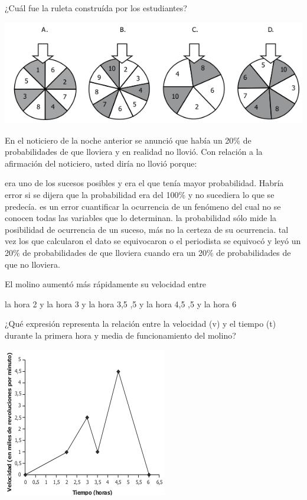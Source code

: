\documentclass[10pt,letterpaper,addpoints]{exam}
\begin{document}
\begin{questions}
¿Cuál fue la ruleta construída por los estudiantes?
\begin{center}
\includegraphics[scale=.65]{Images/ruletas.png}
\end{center}
\question En el noticiero de la noche anterior se anunció que había un 20\% de probabilidades de que lloviera y en realidad no llovió. Con relación a la afirmación del noticiero, usted diría no llovió porque:
\begin{choices}
\choice era uno de los sucesos posibles y era el que tenía mayor probabilidad. Habría error si se dijera que la probabilidad era del 100\% y no sucediera lo que se predecía.
\choice es un error cuantificar la ocurrencia de un fenómeno del cual no se conocen todas las variables que lo determinan.
\CorrectChoice la probabilidad sólo mide la posibilidad de ocurrencia de un suceso, más no la certeza de su ocurrencia.
\choice tal vez los que calcularon el dato se equivocaron o el periodista se equivocó y leyó un 20\% de probabilidades de que lloviera cuando era un 20\% de probabilidades de que no lloviera.
\end{choices}
\begin{minipage}{.45\textwidth}
\question El molino aumentó más rápidamente su velocidad entre
\begin{choices}
\choice la hora 2 y la hora 3
 y la hora 3,5
,5 y la hora 4,5
,5 y la hora 6
\end{choices}
\question ¿Qué expresión representa la relación entre la velocidad (v) y el tiempo (t) durante la
primera hora y media de funcionamiento del molino?
\end{minipage}\hfill
\begin{minipage}{.5\textwidth}
\includegraphics[scale=.75]{Images/velocida_molino.png} 
\end{minipage}


\end{questions}
\end{document}
